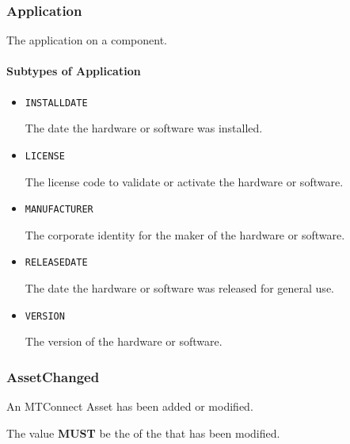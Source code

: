\subsubsection{Application}
\label{sec:Application}



The application on a component.



\paragraph{Subtypes of Application}\mbox{}
\label{sec:Subtypes of Application}

\begin{itemize}

\item \texttt{INSTALL\textunderscore DATE}


The date the hardware or software was installed.

\item \texttt{LICENSE}


The license code to validate or activate the hardware or software.

\item \texttt{MANUFACTURER}


The corporate identity for the maker of the hardware or software.


\item \texttt{RELEASE\textunderscore DATE}


The date the hardware or software was released for general use.


\item \texttt{VERSION}


The version of the hardware or software.


\end{itemize}








\subsubsection{AssetChanged}
\label{sec:AssetChanged}



An \gls{MTConnect Asset} has been added or modified.

The value \textbf{MUST} be the  of the  that has been modified.


